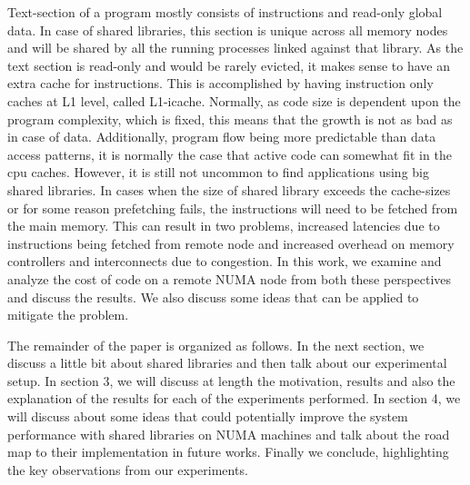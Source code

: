 Text-section of a program mostly consists of instructions and read-only global data. In case of shared libraries, this section
is unique across all memory nodes and will be shared by all the running processes linked against that library. As the text
section is read-only and would be rarely evicted, it makes sense to have an extra cache for instructions. This is accomplished
by having instruction only caches at L1 level, called L1-icache. Normally, as code size is dependent upon the program complexity,
which is fixed, this means that the growth is not as bad as in case of data. Additionally, program flow being more predictable
than data access patterns, it is normally the case that active code can somewhat fit in the cpu caches.
However, it is still not uncommon to find applications using big shared libraries. In cases when the size of shared library exceeds
the cache-sizes or for some reason prefetching fails, the instructions will need to be fetched from the main memory.
This can result in two problems, increased latencies due to instructions being fetched from remote node and increased overhead on
memory controllers and interconnects due to congestion. In this work, we examine and analyze the cost of code on a remote NUMA
node from both these perspectives and discuss the results. We also discuss some ideas that can be applied to mitigate the problem.

The remainder of the paper is organized as follows. In the next section, we discuss a little bit about shared libraries and 
then talk about our experimental setup. In section 3, we will discuss at length the motivation, results and also the explanation
of the results for each of the experiments performed. In section 4, we will discuss about some ideas that could potentially improve
the system performance with shared libraries on NUMA machines and talk about the road map to their implementation in future works.
Finally we conclude, highlighting the key observations from our experiments.

